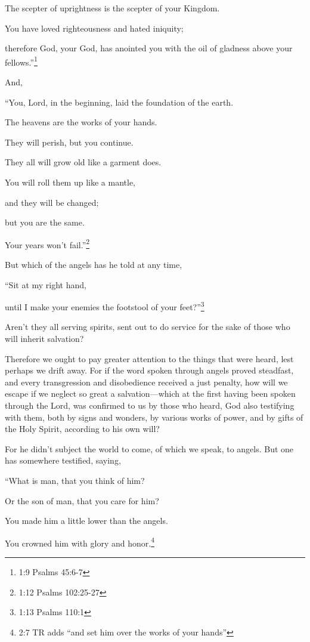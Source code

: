 The scepter of uprightness is the scepter of your Kingdom.

\myverse{}You have loved righteousness and hated iniquity;

therefore God, your God, has anointed you with the oil of gladness above your
fellows.”\footnote{1:9 Psalms 45:6-7}

\myverse{}And,

“You, Lord, in the beginning, laid the foundation of the earth.

The heavens are the works of your hands.

\myverse{}They will perish, but you continue.

They all will grow old like a garment does.

\myverse{}You will roll them up like a mantle,

and they will be changed;

but you are the same.

Your years won’t fail.”\footnote{1:12 Psalms 102:25-27}

\myverse{}But which of the angels has he told at any time,

“Sit at my right hand,

until I make your enemies the footstool of your feet?”\footnote{1:13 Psalms 110:1}

\myverse{}Aren’t they all serving spirits, sent out to do service for the
sake of those who will inherit salvation?


\mychapter{} \myverse*{}Therefore we ought to pay greater attention to the things that
were heard, lest perhaps we drift away.
\myverse{}For if the word spoken through angels proved steadfast, and every transgression
and disobedience received a just penalty,
\myverse{}how will we escape if we neglect so great a salvation—which at the first having
been spoken through the Lord, was confirmed to us by those who heard,
\myverse{}God also testifying with them, both by signs and wonders, by various works of
power, and by gifts of the Holy Spirit, according to his own will?

\myverse{}For he didn’t subject the world to come, of which we speak, to
angels.
\myverse{}But one has somewhere testified, saying,

“What is man, that you think of him?

Or the son of man, that you care for him?

\myverse{}You made him a little lower than the angels.

You crowned him with glory and honor.\footnote{2:7 TR adds “and set him over the works of your hands”}

